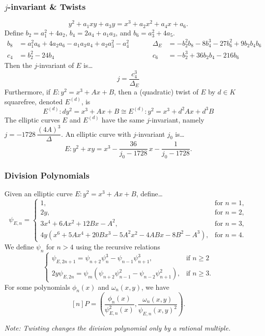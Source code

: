%
\begin{frame}[plain] \frametitle{$j$-invariant \& Twists}
\footnotesize
	\[
	y^2 + a_1xy + a_3y= x^3 + a_2x^2 + a_4x + a_6.
	\] \pspace
Define $b_2= a_1^2 + 4a_2$, $b_4= 2a_4 + a_1a_3$, and $b_6= a_3^2 + 4a_5$.
	\[
	\begin{aligned}
	b_8&= a_1^2a_6 + 4a_2a_6 - a_1a_3a_4 + a_2a_3^2 - a_4^2 &\quad&& \Delta_E&= -b_2^2b_8 - 8b_4^3 - 27b_6^2 + 9b_2b_4b_6 \\
	c_4&= b_2^2 - 24b_4 &&& c_6&= -b_2^3 + 36b_2b_4 - 216b_6
	\end{aligned}
	\]
Then the $j$-invariant of $E$ is\dots
	\[
	 j= \dfrac{c_4^3}{\Delta_E}
	\]
Furthermore, if $E: y^2= x^3 + Ax + B$, then a (quadratic) twist of $E$ by $d \in K$ squarefree, denoted $E^{(d)}$, is
	\[
	E^{(d)}: dy^2= x^3 + Ax + B \cong E^{(d)}: y^2= x^3 + d^2Ax + d^3B 
	\]
The elliptic curves $E$ and $E^{(d)}$ have the same $j$-invariant, namely $j= -1728 \,\dfrac{(4A)^3}{\Delta}$. An elliptic curve with $j$-invariant $j_0$ is\dots
	\[
	E \colon y^2 + xy= x^3 - \dfrac{36}{j_0 - 1728}\,x - \dfrac{1}{j_0 - 1728}.
	\]
\end{frame}





\begin{frame}[plain] \frametitle{Division Polynomials}
\footnotesize
Given an elliptic curve $E: y^2= x^3 + Ax + B$, define\dots
	\[
	\psi_{E,n}= 
	\begin{cases}
	1, & \text{for } n= 1, \\
	2y, & \text{for } n= 2, \\
	3x^4 + 6Ax^2 + 12Bx - A^2, & \text{for } n= 3, \\
	4y(x^6 + 5Ax^4 + 20Bx^3 - 5A^2x^2 - 4ABx - 8B^2 - A^3), & \text{for } n= 4.
	\end{cases}
	\]
We define $\psi_n$ for $n > 4$ using the recursive relations 
	\[
	\begin{cases}
	\psi_{E,{2n+1}}= \psi_{n+2} \psi_n^3 - \psi_{n-1} \psi_{n+1}^3, & \text{if } n \geq 2 \\
	2y\psi_{E,2n}= \psi_m (\psi_{n+2} \psi_{n-1}^2 - \psi_{n-2} \psi_{n+1}^2), & \text{if } n \geq 3.
	\end{cases}
	\]
For some polynomials $\phi_n(x)$ and $\omega_n(x,y)$, we have
	\[
	[n]P= \left( \dfrac{\phi_n(x)}{\psi_{E,n}^2(x)}, \dfrac{\omega_n(x,y)}{\psi_{E,n}(x,y)^2} \right). 
	\]

{\itshape Note: Twisting changes the division polynomial only by a rational multiple.}
\end{frame}





